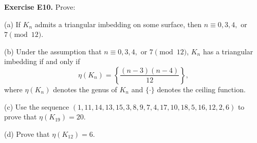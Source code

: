 \textbf{Exercise E10.}
Prove:

(a) If $K_n$ admits a triangular imbedding on some surface, then $n \equiv 0, 3, 4,$ or $7 \pmod{12}$.

(b) Under the assumption that $n \equiv 0, 3, 4,$ or $7 \pmod{12}$, $K_n$ has a triangular imbedding if and only if
$$\eta(K_n) = \left\{ \frac{(n - 3)(n - 4)}{12} \right\},$$
where $\eta(K_n)$ denotes the genus of $K_n$ and $\{\cdot\}$ denotes the ceiling function.

(c) Use the sequence $(1, 11, 14, 13, 15, 3, 8, 9, 7, 4, 17, 10, 18, 5, 16, 12, 2, 6)$ to prove that $\eta(K_{19}) = 20$.

(d) Prove that $\eta(K_{12}) = 6$.
